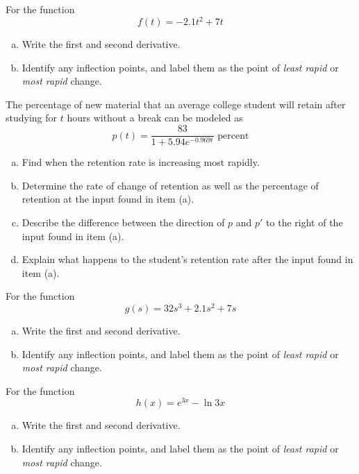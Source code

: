 \documentclass[notes]{subfiles}
\begin{document}
		\begin{ex} For the function
			\[f(t)=-2.1t^2 + 7t\]
			\begin{enumerate}[(a)]
				\item Write the first and second derivative.
					
				\item Identify any inflection points, and label them as the point of \emph{least rapid} or \emph{most rapid} change.
			\end{enumerate}
		\end{ex}
			\newpage
			
		\begin{ex} 
			The percentage of new material that an average college student will retain after studying for $t$ hours without a break can be modeled as
			\[p(t) = \frac{83}{1+5.94e^{-0.969t}}\text{ percent}\]
			\begin{enumerate}[(a)]
				\item Find when the retention rate is increasing most rapidly.
					
				\item Determine the rate of change of retention as well as the percentage of retention at the input found in item (a).
					
				\item Describe the difference between the direction of $p$ and $p'$ to the right of the input found in item (a).
					
				\item Explain what happens to the student's retention rate after the input found in item (a).
					
			\end{enumerate}
		\end{ex}
			\newpage

		\begin{ex} For the function
			\[g(s) = 32s^3 + 2.1s^2 + 7s\]
			\begin{enumerate}[(a)]
				\item Write the first and second derivative.
					\vs{1.5}
					
				\item Identify any inflection points, and label them as the point of \emph{least rapid} or \emph{most rapid} change.
					\vs{1}
			\end{enumerate}
		\end{ex}
		
		\begin{ex} For the function
			\[h(x) = e^{3x} - \ln 3x\]
			\begin{enumerate}[(a)]
				\item Write the first and second derivative.
					\vs{1.5}
					
				\item Identify any inflection points, and label them as the point of \emph{least rapid} or \emph{most rapid} change.
					\vs{1}
					
			\end{enumerate}
		\end{ex}
			\newpage
			
\end{document}
